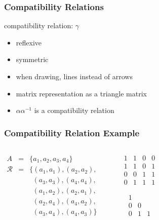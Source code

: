 \documentclass[dvipsnames]{beamer}
\begin{document}
\begin{frame}
  \frametitle{Compatibility Relations}

  \begin{definition}
    \alert{compatibility relation}: $\gamma$
    \begin{itemize}
      \item reflexive
      \item symmetric
    \end{itemize}
  \end{definition}

  \pause
  \begin{itemize}
    \item when drawing, lines instead of arrows
    \item matrix representation as a triangle matrix
  \end{itemize}

  \pause
  \begin{itemize}
    \item $\alpha \alpha^{-1}$ is a compatibility relation
  \end{itemize}
\end{frame}

\begin{frame}
  \frametitle{Compatibility Relation Example}

  \begin{columns}
    \begin{eqnarray*}
      A           & = & \{a_1,a_2,a_3,a_4\}\\
      \mathcal{R} & = & \{(a_1,a_1),(a_2,a_2),\\
		  &   & ~~(a_3,a_3),(a_4,a_4),\\
		  &   & ~~(a_1,a_2),(a_2,a_1),\\
		  &   & ~~(a_2,a_4),(a_4,a_2),\\
		  &   & ~~(a_3,a_4),(a_4,a_3)\}
    \end{eqnarray*}

    \begin{center}

      \bigskip
    \end{center}

    \pause
    \begin{center}
      \[
	\begin{array}{|cccc|}
	  1  &  1  &  0  &  0\\
	  1  &  1  &  0  &  1\\
	  0  &  0  &  1  &  1\\
	  0  &  1  &  1  &  1
	\end{array}
      \]

      \[
	\begin{array}{|ccc|}
	  1  &     & \\
	  0  &  0  & \\
	  0  &  1  &  1
	\end{array}
      \]
    \end{center}
  \end{columns}
\end{frame}
\end{document}
